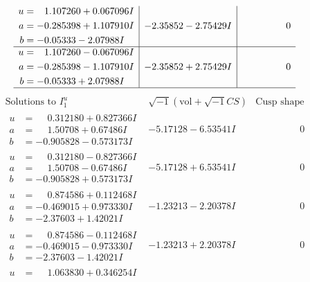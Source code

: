 \documentclass[1p]{elsarticle_modified}
\theoremstyle{definition}
\newcommand{\I}{\sqrt{-1}}
\begin{document}
$$\begin{array}{c|c|c}
\begin{aligned}
u &= \phantom{-}1.107260 + 0.067096 I \\
a &= -0.285398 + 1.107910 I \\
b &= -0.05333 - 2.07988 I\end{aligned}
 & -2.35852 - 2.75429 I & \phantom{-0.000000 } 0 \\ \hline\begin{aligned}
u &= \phantom{-}1.107260 - 0.067096 I \\
a &= -0.285398 - 1.107910 I \\
b &= -0.05333 + 2.07988 I\end{aligned}
 & -2.35852 + 2.75429 I & \phantom{-0.000000 } 0\\
 \hline 
 \end{array}$$\newpage$$\begin{array}{c|c|c}  
\text{Solutions to }I^u_{1}& \I (\text{vol} + \sqrt{-1}CS) & \text{Cusp shape}\\
 \hline 
\begin{aligned}
u &= \phantom{-}0.312180 + 0.827366 I \\
a &= \phantom{-}1.50708 + 0.67486 I \\
b &= -0.905828 - 0.573173 I\end{aligned}
 & -5.17128 - 6.53541 I & \phantom{-0.000000 } 0 \\ \hline\begin{aligned}
u &= \phantom{-}0.312180 - 0.827366 I \\
a &= \phantom{-}1.50708 - 0.67486 I \\
b &= -0.905828 + 0.573173 I\end{aligned}
 & -5.17128 + 6.53541 I & \phantom{-0.000000 } 0 \\ \hline\begin{aligned}
u &= \phantom{-}0.874586 + 0.112468 I \\
a &= -0.469015 + 0.973330 I \\
b &= -2.37603 + 1.42021 I\end{aligned}
 & -1.23213 - 2.20378 I & \phantom{-0.000000 } 0 \\ \hline\begin{aligned}
u &= \phantom{-}0.874586 - 0.112468 I \\
a &= -0.469015 - 0.973330 I \\
b &= -2.37603 - 1.42021 I\end{aligned}
 & -1.23213 + 2.20378 I & \phantom{-0.000000 } 0 \\ \hline\begin{aligned}
u &= \phantom{-}1.063830 + 0.346254 I \\

\end{aligned}
\end{array}$$
\end{document}
